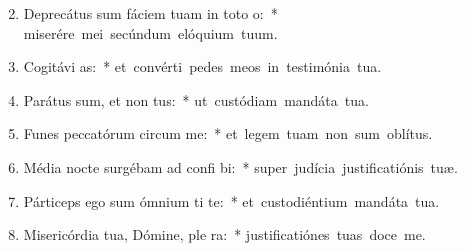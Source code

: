 \begin{flushleft}
\begin{enumerate}[leftmargin=*]
\setcounter{enumi}{1}

\item Deprecátus sum fáciem tuam in toto  o:~* \mbox{miserére mei secúndum elóquium tuum.}
\item Cogitávi  as:~* \mbox{et convérti pedes meos in testimónia tua.}
\item Parátus sum, et non  tus:~* \mbox{ut custódiam mandáta tua.}
\item Funes peccatórum circum  me:~* \mbox{et legem tuam non sum oblítus.}
\item Média nocte surgébam ad confi bi:~* \mbox{super judícia justificatiónis tuæ.}
\item Párticeps ego sum ómnium ti te:~* \mbox{et custodiéntium mandáta tua.}
\item Misericórdia tua, Dómine, ple  ra:~* \mbox{justificatiónes tuas doce me.}


\end{enumerate}
\end{flushleft}

